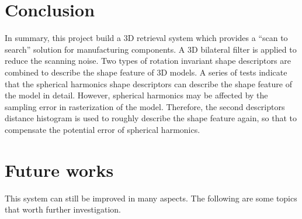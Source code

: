 \section{Conclusion}

In summary, this project build a 3D retrieval system which provides a ``scan to search'' solution for manufacturing components. A 3D bilateral filter is applied to reduce the scanning noise. Two types of rotation invariant shape descriptors are combined to describe the shape feature of 3D models. A series of tests indicate that the spherical harmonics shape descriptors can describe the shape feature of the model in detail. However, spherical harmonics may be affected by the sampling error in rasterization of the model. Therefore, the second descriptors distance histogram is used to roughly describe the shape feature again, so that to compensate the potential error of spherical harmonics. 

\section{Future works}

This system can still be improved in many aspects. The following are some topics that worth further investigation.

